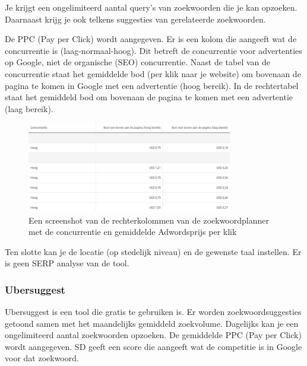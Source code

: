 \newpage
Je krijgt een ongelimiteerd aantal query's van zoekwoorden die je kan opzoeken. Daarnaast krijg je ook telkens suggesties van gerelateerde zoekwoorden. 

De PPC (Pay per Click) wordt aangegeven. Er is een kolom die aangeeft wat de concurrentie is (laag-normaal-hoog). Dit betreft de concurrentie voor advertenties op Google, niet de organische (SEO) concurrentie. Naast de tabel van de concurrentie staat het gemiddelde bod (per klik naar je website) om bovenaan de pagina te komen in Google met een advertentie (hoog bereik). In de rechtertabel staat het gemiddeld bod om bovenaan de pagina te komen met een advertentie (laag bereik). 

\begin{figure}[h!]
\centering
\includegraphics[width=0.8\textwidth]{img/Zoekwoordplannercon.PNG}
\caption{Een screenshot van de rechterkolommen van de zoekwoordplanner met de concurrentie en gemiddelde Adwordsprijs per klik}
\end{figure}

Ten slotte kan je de locatie (op stedelijk niveau) en de gewenste taal instellen. Er is geen SERP analyse van de tool.

\newpage
\subsubsection{Ubersuggest}
\label{ch: Ubersuggest}

Ubersuggest is een tool die gratis te gebruiken is. Er worden zoekwoordsuggesties getoond samen met het maandelijks gemiddeld zoekvolume. Dagelijks kan je een ongelimiteerd aantal zoekwoorden opzoeken. De gemiddelde PPC (Pay per Click) wordt aangegeven. SD geeft een score die aangeeft wat de competitie is in Google voor dat zoekwoord. 

